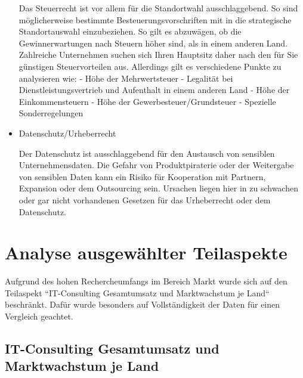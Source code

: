 \begin{itemize}
 Das Steuerrecht ist vor allem für die Standortwahl ausschlaggebend. 
 So sind möglicherweise bestimmte Besteuerungsvorschriften mit in die strategische Standortauswahl einzubeziehen. So gilt es abzuwägen, ob die Gewinnerwartungen nach Steuern höher sind, als in einem anderen Land. Zahlreiche Unternehmen suchen sich Ihren Hauptsitz daher nach den für Sie günstigen Steuervorteilen aus.
 Allerdings gilt es verschiedene Punkte zu analysieren wie:
 - Höhe der Mehrwertsteuer
 - Legalität bei Dienstleistungsvertrieb und Aufenthalt in einem anderen Land
 - Höhe der Einkommensteuern
 - Höhe der Gewerbesteuer/Grundsteuer
 - Spezielle Sonderregelungen
  \\
\item {Datenschutz/Urheberrecht}

  Der Datenschutz ist ausschlaggebend für den Austausch von sensiblen Unternehmensdaten. 
  Die Gefahr von Produktpiraterie oder der Weitergabe von sensiblen Daten kann ein Risiko für Kooperation mit Partnern, Expansion oder dem Outsourcing sein. Ursachen liegen hier in zu schwachen oder gar nicht vorhandenen Gesetzen für das Urheberrecht oder dem Datenschutz.
  
  \end{itemize}

\section{Analyse ausgewählter Teilaspekte}
Aufgrund des hohen Rechercheumfangs im Bereich Markt wurde sich auf den Teilaspekt ``IT-Consulting Gesamtumsatz und Marktwachstum je Land`` beschränkt. Dafür wurde besonders auf Vollständigkeit der Daten für einen Vergleich geachtet. 
\subsection*{IT-Consulting Gesamtumsatz und Marktwachstum je Land}
\label{subsubsec:Gesamtumsatz}

